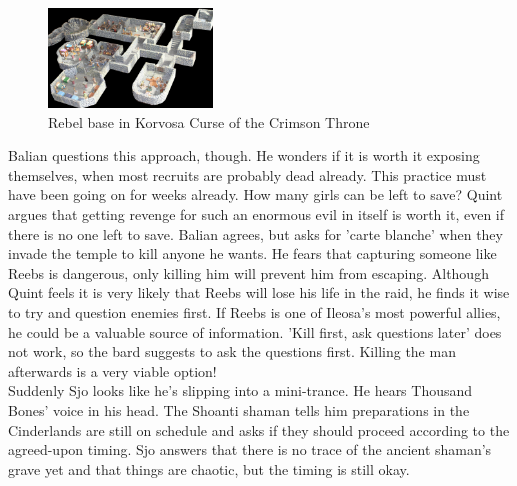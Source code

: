 \begin{figure}[h]
	\centering
	\includegraphics[width=0.39\textwidth]{images/Rebel-base-in-Korvosa-Curse-of-the-Crimson-Throne-614606623.jpg}
	\caption{Rebel base in Korvosa Curse of the Crimson Throne}
	\label{fig:Rebel-base-in-Korvosa-Curse-of-the-Crimson-Throne-614606623}
\end{figure}

Balian questions this approach, though. He wonders if it is worth it exposing themselves, when most recruits are probably dead already. This practice must have been going on for weeks already. How many girls can be left to save? Quint argues that getting revenge for such an enormous evil in itself is worth it, even if there is no one left to save. Balian agrees, but asks for 'carte blanche' when they invade the temple to kill anyone he wants. He fears that capturing someone like Reebs is dangerous, only killing him will prevent him from escaping. Although Quint feels it is very likely that Reebs will lose his life in the raid, he finds it wise to try and question enemies first. If Reebs is one of Ileosa's most powerful allies, he could be a valuable source of information. 'Kill first, ask questions later' does not work, so the bard suggests to ask the questions first. Killing the man afterwards is a very viable option!\\

Suddenly Sjo looks like he's slipping into a mini-trance. He hears Thousand Bones' voice in his head. The Shoanti shaman tells him preparations in the Cinderlands are still on schedule and asks if they should proceed according to the agreed-upon timing. Sjo answers that there is no trace of the ancient shaman's grave yet and that things are chaotic, but the timing is still okay.\\

